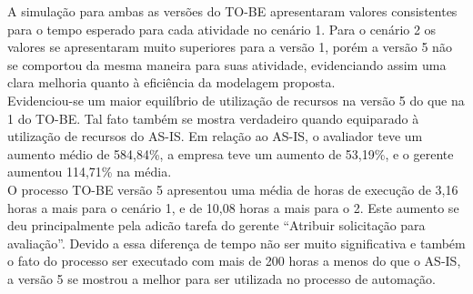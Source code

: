 A simulação para ambas as versões do TO-BE apresentaram valores consistentes para o tempo esperado para cada atividade no cenário 1. Para o cenário 2 os valores se apresentaram muito superiores para a versão 1, porém a versão 5 não se comportou da mesma maneira para suas atividade, evidenciando assim uma clara melhoria quanto à eficiência da modelagem proposta. 
\\ \indent Evidenciou-se um maior equilíbrio de utilização de recursos na versão 5 do que na 1 do TO-BE. Tal fato também se mostra verdadeiro quando equiparado à utilização de recursos do AS-IS. Em relação ao AS-IS, o avaliador teve um aumento médio de 584,84\%, a empresa teve um aumento de 53,19\%, e o gerente aumentou 114,71\% na média.
\\ \indent O processo TO-BE versão 5 apresentou uma média de horas de execução de 3,16 horas a mais para o cenário 1, e de 10,08 horas a mais para o 2. Este aumento se deu principalmente pela adicão tarefa do gerente “Atribuir solicitação para avaliação”. Devido a essa diferença de tempo não ser muito significativa e também o fato do processo ser executado com mais de 200 horas a menos do que o AS-IS, a versão 5 se mostrou a melhor para ser utilizada no processo de automação.